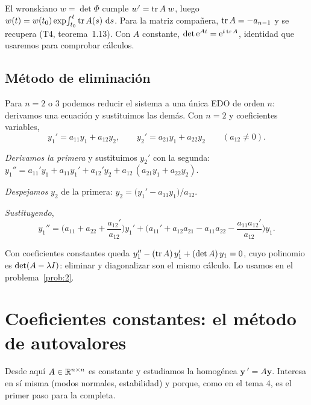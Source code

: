 \documentclass[11pt,twoside]{article}
\newcommand\vy{\bm{y}}
\begin{document}
\begin{recordatorio}
El wronskiano $w=\det\Phi$ cumple $w'=\operatorname{tr} A\;w$, luego $w(t)=w(t_0)\exp\!\int_{t_0}^{t}\operatorname{tr} A(s)\,\mathop{}\!\mathrm{d} s$. Para la
matriz compañera, $\operatorname{tr} A=-a_{n-1}$ y se recupera (T4, teorema~1.13). Con $A$ constante,
$\det\mathrm{e}^{At}=\mathrm{e}^{t\operatorname{tr} A}$, identidad que usaremos para comprobar cálculos.
\end{recordatorio}

\subsection{Método de eliminación}\label{sec:eliminacion}

Para $n=2$ o $3$ podemos reducir el sistema a una única EDO de orden $n$: derivamos una ecuación y sustituimos
las demás. Con $n=2$ y coeficientes variables,
\begin{equation*}
y_1'=a_{11}y_1+a_{12}y_2,\qquad y_2'=a_{21}y_1+a_{22}y_2\qquad(a_{12}\neq0).
\end{equation*}

\begin{pasos}
\item \emph{Derivamos la primera} y sustituimos $y_2'$ con la segunda:
$y_1''=a_{11}'y_1+a_{11}y_1'+a_{12}'y_2+a_{12}\,(a_{21}y_1+a_{22}y_2)$.
\item \emph{Despejamos} $y_2$ de la primera: $y_2=\big(y_1'-a_{11}y_1\big)/a_{12}$.
\item \emph{Sustituyendo},
\begin{equation}\label{eq:eliminacion}
y_1''=\Big(a_{11}+a_{22}+\frac{a_{12}'}{a_{12}}\Big)y_1'
+\Big(a_{11}'+a_{12}a_{21}-a_{11}a_{22}-\frac{a_{11}a_{12}'}{a_{12}}\Big)y_1 .
\end{equation}
\end{pasos}
Con coeficientes constantes queda $y_1''-(\operatorname{tr} A)\,y_1'+(\det A)\,y_1=0$, cuyo polinomio es $\det(A-\lambda I)$:
eliminar y diagonalizar son el mismo cálculo. Lo usamos en el problema~\ref{prob:2}.

\section{Coeficientes constantes: el método de autovalores}\label{sec:autovalores}

Desde aquí $A\in\mathbb{R}^{n\times n}$ es constante y estudiamos la homogénea $\vy\,'=A\vy$. Interesa en sí misma
(modos normales, estabilidad) y porque, como en el tema 4, es el primer paso para la completa.
\end{document}
